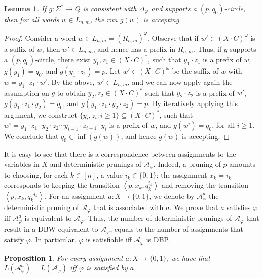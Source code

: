 \documentclass[10pt,a4paper]{amsart}
\newtheorem{lem}[thm]{Lemma}
\newtheorem{prop}[thm]{Proposition}
\theoremstyle{definition}
\numberwithin{equation}{section}
\newcommand{\A}{{\mathcal A}}
\newcommand{\zug}[1]{\left\langle #1 \right\rangle}
\begin{document}
\begin{lem}\label{criterion for Lnm winning strategy}
	If $g:\Sigma^*\rightarrow Q$ is consistent with $\Delta_\varphi$ and supports a $(p,q_0)$-circle, then for all words $w\in L_{n,m}$, the run $g(w)$ is accepting.
\end{lem}

\begin{proof}
	Consider a word $w\in L_{n,m}=(R_{n,m})^\omega$. Observe that if $w'\in (X\cdot C)^\omega$ is a suffix of $w$, then $w'\in L_{n,m}$, and hence has a prefix in $R_{n,m}$. Thus, if $g$ supports a $(p,q_0)$-circle, there exist $y_1,z_1\in (X\cdot C)^*$, such that $y_1\cdot z_1$ is a prefix of $w$, $g(y_1)=q_0$, and $g(y_1\cdot z_1)=p$. Let $w' \in (X\cdot C)^\omega$ be the suffix of $w$ with $w=y_1\cdot z_1\cdot w'$. By the above, $w'\in L_{n,m}$, and we can now apply again the assumption on $g$ to obtain $y_2,z_2\in (X\cdot C)^*$ such that $y_2\cdot z_2$ is a prefix of $w'$, $g(y_1\cdot z_1\cdot y_2)=q_0$, and $g(y_1\cdot z_1\cdot y_2\cdot z_2)=p$. By iteratively applying this argument, we construct $\{y_i,z_i:i\geq 1\}\subseteq (X\cdot C)^*$, such that $w^i=y_1\cdot z_1\cdot y_2\cdot z_2\cdots y_{i-1}\cdot z_{i-1}\cdot y_i$ is a prefix of $w$, and $g(w^i)=q_0$, for all $i\geq 1$. We conclude that $q_0\in \inf (g(w))$, and hence $g(w)$ is accepting.
\end{proof}

It is easy to see that there is a correspondence between assignments to the variables in $X$ and deterministic prunings of $ \A_\varphi $. Indeed, a pruning of $p$ amounts  to choosing, for each $ k\in [n]$, a value $ i_k\in {\{0,1\}} $: the assignment $x_k=i_k $ corresponds to keeping the transition $ \zug{p,x_k,q^{i_k}_k} $ and removing the transition $ \zug{p,x_k,q^{\lnot i_k}_k} $. For an assignment $a:X \rightarrow {\{0,1\}}$, we denote by $\A_\varphi^{a}$ the deterministic pruning of $\A_\varphi$ that is associated with $a$. We prove that $a$ satisfies $\varphi$ iff $\A_\varphi^{a}$ is equivalent to $\A_\varphi$. Thus, the number of deterministic prunings of $\A_\varphi$ that result in a DBW equivalent to $\A_\varphi$, equals to the number of assignments that satisfy $\varphi$. In particular, $\varphi$ is satisfiable iff $\A_\varphi$ is DBP. 

\begin{prop}
For every assignment $a	:X \rightarrow {\{0,1\}}$, we have that $ L(\A^{a}_\varphi)=L(\A_\varphi) $ iff $ \varphi  $ is satisfied by $a$.
\end{prop}
\end{document}

